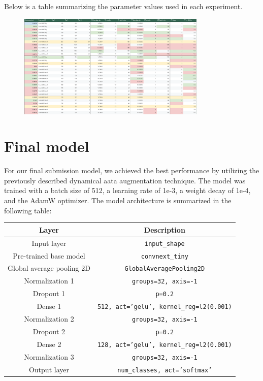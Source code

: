 \documentclass[11pt]{article}
\begin{document}
Below is a table summarizing the parameter values used in each experiment.

\begin{figure}[H]
    \centering
    \includegraphics[width=0.8\textwidth]{reports/images/hyperparameter_tuning.pdf}
\end{figure}

\section{Final model}

For our final submission model, we achieved the best performance by utilizing the previously described dynamical aata augmentation technique.
The model was trained with a batch size of 512, a learning rate of 1e-3, a weight decay of 1e-4, and the AdamW optimizer.
The model architecture is summarized in the following table:

\begin{table}[h!]
    \centering
    \begin{tabular}{|c|c|}
        \hline
        \textbf{Layer} & \textbf{Description} \\ \hline
        Input layer & \texttt{input\_shape} \\ \hline
        Pre-trained base model & \texttt{convnext\_tiny} \\ \hline
        Global average pooling 2D & \texttt{GlobalAveragePooling2D} \\ \hline
        Normalization 1 & \texttt{groups=32, axis=-1} \\ \hline
        Dropout 1 & \texttt{p=0.2} \\ \hline
        Dense 1 & \texttt{512, act='gelu', kernel\_reg=l2(0.001)} \\ \hline
        Normalization 2 & \texttt{groups=32, axis=-1} \\ \hline
        Dropout 2 & \texttt{p=0.2} \\ \hline
        Dense 2 & \texttt{128, act='gelu', kernel\_reg=l2(0.001)} \\ \hline
        Normalization 3 & \texttt{groups=32, axis=-1} \\ \hline
        Output layer & \texttt{num\_classes, act='softmax'} \\ \hline
    \end{tabular}
\end{table}
\end{document}

